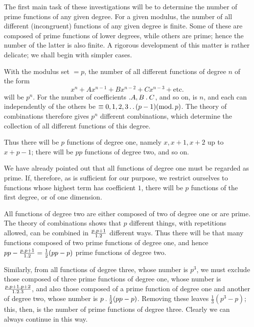 The first main task of these investigations will be to determine the number of prime functions of any given degree. For a given modulus, the number of all different (incongruent) functions of any given degree is finite. Some of these are composed of prime functions of lower degrees, while others are prime; hence the number of the latter is also finite. A rigorous development of this matter is rather delicate; we shall begin with simpler cases.

With the modulus set $=p$, the number of all different functions of degree $n$ of the form
\[
x^n+Ax^{n-1}+Bx^{n-2}+Cx^{n-3}+\text{etc.}
\]
will be $p^n$. For the number of coefficients $\mathbin{.} A,B\mathbin{.} C$, and so on, is $n$, and each can independently of the others be $\equiv0,1,2,3\mathinner{.\,.}(p-1)(\mathrm{mod.}\,p)$. The theory of combinations therefore gives $p^n$ different combinations, which determine the collection of all different functions of this degree.

Thus there will be $p$ functions of degree one, namely $x,x+1,x+2$ up to $x+p-1$; there will be $pp$ functions of degree two, and so on.

We have already pointed out that all functions of degree one must be regarded as prime. If, therefore, as is sufficient for our purpose, we restrict ourselves to functions whose highest term has coefficient $1$, there will be $p$ functions of the first degree, or of one dimension.

All functions of degree two are either composed of two of degree one or are prime. The theory of combinations shows that $p$ different things, with repetitions allowed, can be combined in $\frac{p\mathbin{.} p+1}{1\mathbin{.}2}$ different ways. Thus there will be that many functions composed of two prime functions of degree one, and hence $pp-\frac{p\mathbin{.} p+1}{1\mathbin{.}2}=\frac12(pp-p)$ prime functions of degree two.

Similarly, from all functions of degree three, whose number is $p^3$, we must exclude those composed of three prime functions of degree one, whose number is $\frac{p\mathbin{.} p+1\mathbin{.} p+2}{1\mathbin{.}2\mathbin{.}3}$, and also those composed of a prime function of degree one and another of degree two, whose number is $p\mathbin{.}\frac12(pp-p)$. Removing these leaves $\frac13(p^3-p)$; this, then, is the number of prime functions of degree three. Clearly we can always continue in this way.

